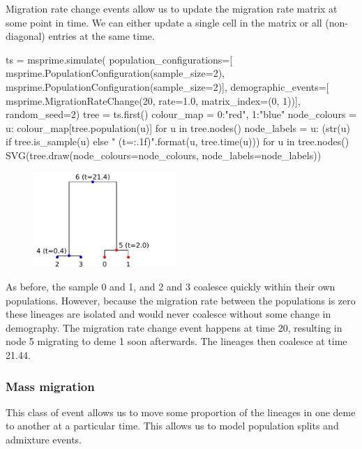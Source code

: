 \documentclass[graybox]{svmult}
\newcommand{\includenbimage}[1]{\begin{center}\texttt{[image: \#1]}\end{center}}
\begin{document}
Migration rate change events allow us to update the migration rate
matrix at some point in time. We can either update a single cell in the
matrix or all (non-diagonal) entries at the same time.
\begin{pythoncode}
ts  = msprime.simulate(
    population_configurations=[
        msprime.PopulationConfiguration(sample_size=2),
        msprime.PopulationConfiguration(sample_size=2)],
    demographic_events=[
        msprime.MigrationRateChange(20, rate=1.0, matrix_index=(0, 1))],
    random_seed=2)
tree = ts.first()
colour_map = {0:"red", 1:"blue"}
node_colours = {u: colour_map[tree.population(u)] for u in tree.nodes()}
node_labels = {
    u: (str(u) if tree.is_sample(u) else "{} (t={:.1f})".format(u,
tree.time(u)))
    for u in tree.nodes()}
SVG(tree.draw(node_colours=node_colours, node_labels=node_labels))
\end{pythoncode}

\begin{figure}
  \begin{center}
    \includegraphics[width=0.48\textwidth]{images/simulations_34_0.pdf}
  \end{center}
\end{figure}

    As before, the sample 0 and 1, and 2 and 3 coalesce quickly within their
own populations. However, because the migration rate between the
populations is zero these lineages are isolated and would never coalesce
without some change in demography. The migration rate change event
happens at time 20, resulting in node 5 migrating to deme 1 soon
afterwards. The lineages then coalesce at time 21.44.

\subsubsection{Mass migration}\label{mass-migration}

This class of event allows us to move some proportion of the lineages in
one deme to another at a particular time. This allows us to model
population splits and admixture events.
\end{document}
